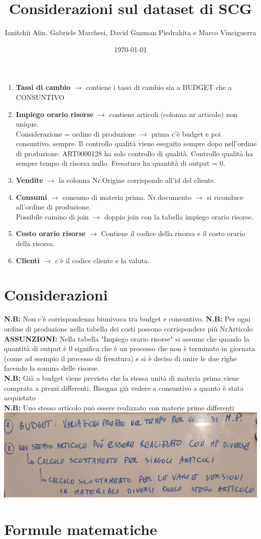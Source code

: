 \documentclass{article}
\title{Considerazioni sul dataset di SCG }
\author{Ianitchii Alin, Gabriele Marchesi, David Guzman Piedrahita e Marco Vinciguerra}
\date{\today}
\begin{document}
\maketitle
\begin{enumerate}
    \item \textbf{Tassi di cambio} $\rightarrow$ contiene i tassi di cambio sia a BUDGET che a CONSUNTIVO
    \item \textbf{Impiego orario risorse} $\rightarrow$ contiene articoli (colonna nr articolo) non unique. 
    \\Considerazione = ordine di produzione $\rightarrow$ prima c’è budget e poi consuntivo, sempre. Il controllo qualità viene eseguito sempre dopo nell’ordine di produzione. ART0000128 ha solo controllo di qualità.
    Controllo qualità ha sempre tempo di risorsa nullo. Fresatura ha quantità di output = 0.
    \item \textbf{Vendite} $\rightarrow$ la colonna Nr.Origine corrisponde all’id del cliente.
    \item \textbf{Consumi} $\rightarrow$ consumo di materia prima. Nr.documento $\rightarrow$ si riconduce all’ordine di produzione.
    \\Possibile camino di join $\rightarrow$ doppio join con la tabella impiego orario risorse.
    \item \textbf{Costo orario risorse} $\rightarrow$ Contiene il codice della risorsa e il costo orario della risorsa.
    \item \textbf{Clienti} $\rightarrow$ c’è il codice cliente e la valuta.
\end{enumerate}
\section{Considerazioni}
\textbf{N.B:} Non c’è corrispondenza biunivoca tra budget e consuntivo.
\textbf{N.B:} Per ogni ordine di produzione nella tabella dei costi possono corrispondere più NrArticolo
\\\textbf{ASSUNZIONI:} Nella tabella "Impiego orario risorse" si assume che quando la quantità di output è 0 significa che è un processo che non è terminato in giornata (come ad esempio il 
processo di fresatura) e si è deciso di unire le due righe facendo la somma delle risorse.
\\\textbf{N.B:} Già a budget viene previsto che la stessa unità di materia prima viene comprata a prezzi differenti. Bisogna già vedere a consuntivo a quanto è stata acquistato
\\\textbf{N.B:} Uno stesso articolo può essere realizzato con materie prime differenti
\\\includegraphics[scale = 0.4]{Lavagnetta.jpg}
\section{Formule matematiche}
\end{document}
